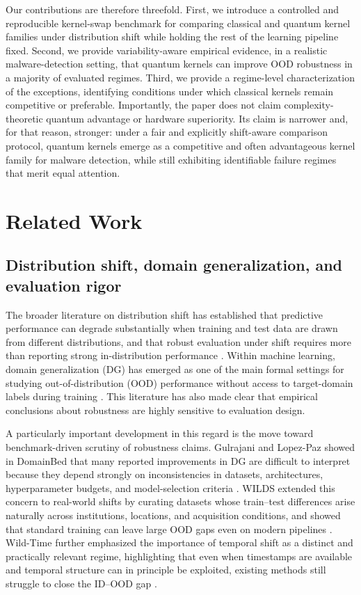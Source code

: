 \documentclass[pdflatex,sn-mathphys-num]{sn-jnl}%
\theoremstyle{thmstyleone}%
\theoremstyle{thmstyletwo}%
\theoremstyle{thmstylethree}%
\begin{document}
Our contributions are therefore threefold. First, we introduce a controlled and reproducible kernel-swap benchmark for comparing classical and quantum kernel families under distribution shift while holding the rest of the learning pipeline fixed. Second, we provide variability-aware empirical evidence, in a realistic malware-detection setting, that quantum kernels can improve OOD robustness in a majority of evaluated regimes. Third, we provide a regime-level characterization of the exceptions, identifying conditions under which classical kernels remain competitive or preferable. Importantly, the paper does not claim complexity-theoretic quantum advantage or hardware superiority. Its claim is narrower and, for that reason, stronger: under a fair and explicitly shift-aware comparison protocol, quantum kernels emerge as a competitive and often advantageous kernel family for malware detection, while still exhibiting identifiable failure regimes that merit equal attention.

\section{Related Work}
\label{sec:related_work}

\subsection{Distribution shift, domain generalization, and evaluation rigor}

The broader literature on distribution shift has established that predictive performance can degrade substantially when training and test data are drawn from different distributions, and that robust evaluation under shift requires more than reporting strong in-distribution performance \cite{quinonero-candela2008datasetshift,shimodaira2000covariateshift,sugiyama2007iwcv}. Within machine learning, domain generalization (DG) has emerged as one of the main formal settings for studying out-of-distribution (OOD) performance without access to target-domain labels during training \cite{zhou2023dgsurvey}. This literature has also made clear that empirical conclusions about robustness are highly sensitive to evaluation design.

A particularly important development in this regard is the move toward benchmark-driven scrutiny of robustness claims. Gulrajani and Lopez-Paz showed in DomainBed that many reported improvements in DG are difficult to interpret because they depend strongly on inconsistencies in datasets, architectures, hyperparameter budgets, and model-selection criteria \cite{gulrajani2021domainbed}. WILDS extended this concern to real-world shifts by curating datasets whose train--test differences arise naturally across institutions, locations, and acquisition conditions, and showed that standard training can leave large OOD gaps even on modern pipelines \cite{koh2021wilds}. Wild-Time further emphasized the importance of temporal shift as a distinct and practically relevant regime, highlighting that even when timestamps are available and temporal structure can in principle be exploited, existing methods still struggle to close the ID--OOD gap \cite{yao2022wildtime}.
\end{document}
